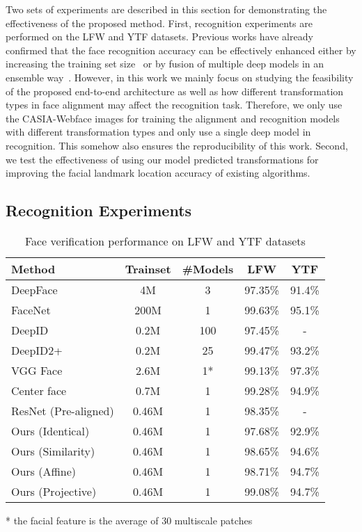 \documentclass[10pt,twocolumn,letterpaper]{article}
\begin{document}
Two sets of experiments are described in this section for demonstrating the effectiveness of the proposed method. 
First, recognition experiments are performed on the LFW and YTF datasets.
Previous works have already confirmed that the face recognition accuracy can be effectively enhanced either by increasing the training set size~\cite{schroff2015facenet} or by fusion of multiple deep models in an ensemble way~\cite{sun2015deepid3}. 
However, in this work we mainly focus on studying the feasibility of the proposed end-to-end architecture as well as how different transformation types in face alignment may affect the recognition task. 
Therefore, we only use the CASIA-Webface images for training the alignment and recognition models with different transformation types and only use a single deep model in recognition.
This somehow also ensures the reproducibility of this work.  
Second, we test the effectiveness of using our model predicted transformations for improving the facial landmark location accuracy of existing algorithms.

\subsection{Recognition Experiments}

	\begin{table}[t]
		\setlength{\tabcolsep}{3pt}
		\caption{Face verification performance on LFW and YTF datasets}
		\label{tablePerform}
		\centering
		\begin{tabular}{lcccc}%
			\hline
			Method & Trainset & \#Models & LFW & YTF\\
			\hline
			DeepFace~\cite{taigman2014deepface} & 4M & 3 & 97.35\% & 91.4\% \\
			FaceNet~\cite{schroff2015facenet} & 200M & 1 & 99.63\% & 95.1\% \\
            DeepID~\cite{sun2014deep2} & 0.2M & 100 & 97.45\% & - \\
            DeepID2+~\cite{sun2015deeply} & 0.2M & 25 & 99.47\% & 93.2\% \\
            VGG Face~\cite{parkhi2015deep} & 2.6M & 1* & 99.13\% & 97.3\% \\
            Center face~\cite{wen2016discriminative} & 0.7M & 1 & 99.28\% & 94.9\% \\
            \hline
            ResNet (Pre-aligned) & 0.46M & 1 & 98.35\% & - \\
	    Ours (Identical) & 0.46M & 1 & 97.68\% & 92.9\% \\
	    Ours (Similarity) & 0.46M & 1 & 98.65\% & 94.6\% \\
	    Ours (Affine) & 0.46M & 1 & 98.71\% & 94.7\% \\
            Ours (Projective) & 0.46M & 1 & 99.08\% & 94.7\% \\
			\hline
		\end{tabular}
		* the facial feature is the average of 30 multiscale patches
	\end{table}
\end{document}

